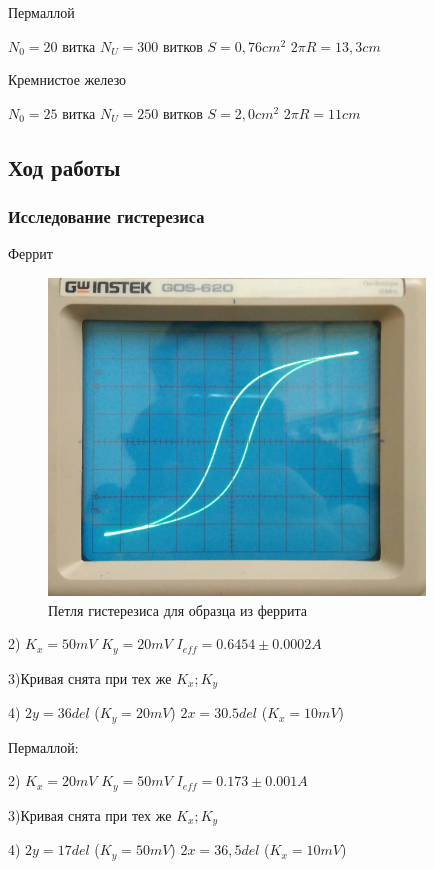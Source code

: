 \documentclass[a4paper,12pt]{article}
\begin{document}
Пермаллой

$N_0 = 20$ витка
$N_U = 300 $ витков
$S = 0,76 cm^2$
$2\pi R = 13,3 cm$
\medskip

Кремнистое железо

$N_0 = 25$ витка
$N_U = 250 $ витков
$S = 2,0 cm^2$
$2\pi R = 11 cm$




\bigskip

\subsection*{Ход работы}
\bigskip

\subsubsection*{Исследование гистерезиса}

Феррит
\begin{figure}[ht]
\centering
\includegraphics[width=100mm]{Ferrit.jpg}
\caption{Петля гистерезиса для образца из феррита}\label{schema}
\end{figure}

2)
$K_x = 50mV$
$K_y = 20mV$
$I_{eff} = 0.6454 \pm 0.0002 A$

3)Кривая снята при тех же $K_x; K_y$

4)
$2y = 36 del$
($K_y = 20mV$)
$2x = 30.5 del$
($K_x = 10 mV$)
\medskip

Пермаллой:

2)
$K_x = 20mV$
$K_y = 50mV$
$I_{eff} = 0.173 \pm 0.001 A$

3)Кривая снята при тех же $K_x; K_y$

4)
$2y = 17 del$
($K_y = 50mV$)
$2x = 36,5 del$
($K_x = 10 mV$)
\medskip
\end{document}
